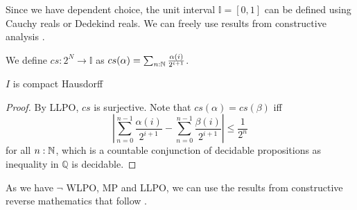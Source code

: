 Since we have dependent choice, the unit interval $\mathbb I = [0,1]$ can be defined using 
Cauchy reals or Dedekind reals. 
We can freely use results from constructive analysis \cite{Bishop}. 
\begin{definition}
  We define $cs:2^N \to \mathbb I$ as 
  $cs(\alpha) = \sum_{n:\mathbb{N}} \frac{\alpha(i)}{2^{i+1}}$. 
\end{definition}

\begin{theorem}
  $I$ is compact Hausdorff
\end{theorem}
\begin{proof}
  By LLPO, $cs$ is surjective.   
  Note that $cs(\alpha) = cs(\beta)$ iff 
  $$|\sum_{n=0}^{n-1} \frac{\alpha(i)}{2^{i+1}}-
  \sum_{n=0}^{n-1} \frac{\beta(i)}{2^{i+1}}|\leq \frac{1}{2^n}$$
  for all $n:\mathbb{N}$, which is a countable conjunction of decidable propositions as 
  inequality in $\mathbb Q$ is decidable. 
\end{proof}

As we have $\neg$ WLPO, MP and LLPO, we can use the results from 
constructive reverse mathematics that follow \cite{ReverseMathsBishop, HannesDiener}. 
